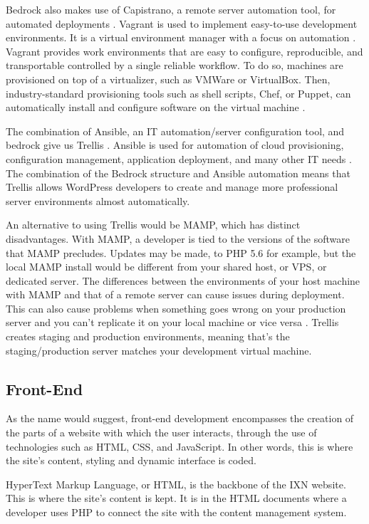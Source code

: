 Bedrock also makes use of Capistrano, a remote server automation tool,
for automated deployments \cite{p9}. Vagrant is used to implement
easy-to-use development environments. It is a virtual environment
manager with a focus on automation \cite{p10} . Vagrant provides work
environments that are easy to configure, reproducible, and transportable
controlled by a single reliable workflow. To do so, machines are
provisioned on top of a virtualizer, such as VMWare or VirtualBox. Then,
industry-standard provisioning tools such as shell scripts, Chef, or
Puppet, can automatically install and configure software on the virtual
machine \cite{p10} .

The combination of Ansible, an IT automation/server configuration tool,
and bedrock give us Trellis \cite{p11}. Ansible is used for automation
of cloud provisioning, configuration management, application deployment,
and many other IT needs \cite{p12}. The combination of the Bedrock
structure and Ansible automation means that Trellis allows WordPress
developers to create and manage more professional server environments
almost automatically.

An alternative to using Trellis would be MAMP, which has distinct
disadvantages. With MAMP, a developer is tied to the versions of the
software that MAMP precludes. Updates may be made, to PHP 5.6 for
example, but the local MAMP install would be different from your shared
host, or VPS, or dedicated server. The differences between the
environments of your host machine with MAMP and that of a remote server
can cause issues during deployment. This can also cause problems when
something goes wrong on your production server and you can't replicate
it on your local machine or vice versa \cite{p13} . Trellis creates
staging and production environments, meaning that's the
staging/production server matches your development virtual machine.

\hypertarget{front-end}{%
\subsection{Front-End}\label{front-end}}

As the name would suggest, front-end development encompasses the
creation of the parts of a website with which the user interacts,
through the use of technologies such as HTML, CSS, and JavaScript. In
other words, this is where the site's content, styling and dynamic
interface is coded.

HyperText Markup Language, or HTML, is the backbone of the IXN website.
This is where the site's content is kept. It is in the HTML documents
where a developer uses PHP to connect the site with the content
management system.

